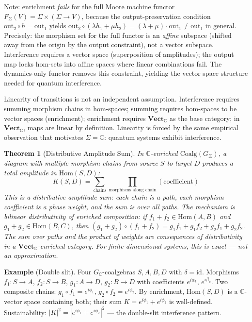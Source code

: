 \documentclass[12pt,a4paper]{article}
\newtheorem{theorem}{Theorem}
\begin{document}
Note: enrichment \emph{fails} for the full Moore machine functor $F_\Sigma(V) = \Sigma \times (\Sigma \to V)$, because the output-preservation condition $\text{out}_2 \circ h = \text{out}_1$ yields $\text{out}_2 \circ (\lambda h_1 + \mu h_2) = (\lambda + \mu) \cdot \text{out}_1 \neq \text{out}_1$ in general. Precisely: the morphism set for the full functor is an \emph{affine} subspace (shifted away from the origin by the output constraint), not a vector subspace. Interference requires a vector space (superposition of amplitudes); the output map locks hom-sets into affine spaces where linear combinations fail. The dynamics-only functor removes this constraint, yielding the vector space structure needed for quantum interference.

Linearity of transitions is not an independent assumption. Interference requires summing morphism chains in hom-spaces; summing requires hom-spaces to be vector spaces (enrichment); enrichment requires $\mathbf{Vect}_{\mathbb{C}}$ as the base category; in $\mathbf{Vect}_{\mathbb{C}}$, maps are linear by definition. Linearity is forced by the same empirical observation that motivates $\Sigma = \mathbb{C}$: quantum systems exhibit interference.

\begin{theorem}[Distributive Amplitude Sum]
\label{thm:amplitude-sum}
In $\mathbb{C}$-enriched $\text{Coalg}(G_\Sigma)$, a diagram with multiple morphism chains from source $S$ to target $D$ produces a total amplitude in $\text{Hom}(S, D)$:
$$K(S, D) = \sum_{\text{chains}} \prod_{\text{morphisms along chain}} (\text{coefficient})$$
This is a distributive amplitude sum: each chain is a path, each morphism coefficient is a phase weight, and the sum is over all paths. The mechanism is bilinear distributivity of enriched composition: if $f_1 + f_2 \in \text{Hom}(A, B)$ and $g_1 + g_2 \in \text{Hom}(B, C)$, then $(g_1 + g_2) \circ (f_1 + f_2) = g_1 f_1 + g_1 f_2 + g_2 f_1 + g_2 f_2$. The sum over paths and the product of weights are consequences of distributivity in a $\mathbf{Vect}_{\mathbb{C}}$-enriched category. For finite-dimensional systems, this is exact --- not an approximation.
\end{theorem}

\textbf{Example} (Double slit). Four $G_\mathbb{C}$-coalgebras $S, A, B, D$ with $\delta = \text{id}$. Morphisms $f_1 : S \to A$, $f_2 : S \to B$, $g_1 : A \to D$, $g_2 : B \to D$ with coefficients $e^{i\alpha_k}$, $e^{i\beta_k}$. Two composite chains: $g_1 \circ f_1 = e^{i\phi_1}$, $g_2 \circ f_2 = e^{i\phi_2}$. By enrichment, $\text{Hom}(S, D)$ is a $\mathbb{C}$-vector space containing both; their sum $K = e^{i\phi_1} + e^{i\phi_2}$ is well-defined. Sustainability: $|K|^2 = |e^{i\phi_1} + e^{i\phi_2}|^2$ --- the double-slit interference pattern.
\end{document}
